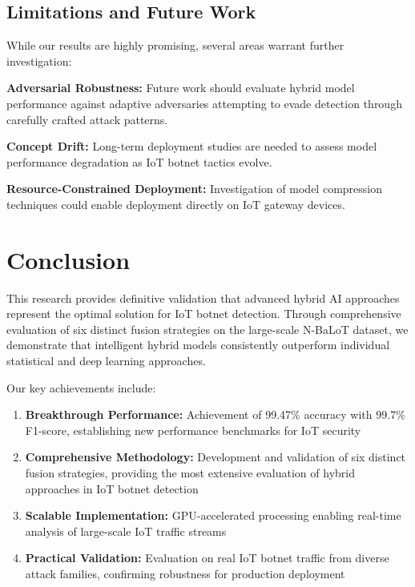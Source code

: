 \documentclass[conference]{IEEEtran}
\begin{document}
\subsection{Limitations and Future Work}
While our results are highly promising, several areas warrant further investigation:

\textbf{Adversarial Robustness:} Future work should evaluate hybrid model performance against adaptive adversaries attempting to evade detection through carefully crafted attack patterns.

\textbf{Concept Drift:} Long-term deployment studies are needed to assess model performance degradation as IoT botnet tactics evolve.

\textbf{Resource-Constrained Deployment:} Investigation of model compression techniques could enable deployment directly on IoT gateway devices.

\section{Conclusion}
This research provides definitive validation that advanced hybrid AI approaches represent the optimal solution for IoT botnet detection. Through comprehensive evaluation of six distinct fusion strategies on the large-scale N-BaLoT dataset, we demonstrate that intelligent hybrid models consistently outperform individual statistical and deep learning approaches.

Our key achievements include:
\begin{enumerate}
    \item \textbf{Breakthrough Performance:} Achievement of 99.47\% accuracy with 99.7\% F1-score, establishing new performance benchmarks for IoT security
    \item \textbf{Comprehensive Methodology:} Development and validation of six distinct fusion strategies, providing the most extensive evaluation of hybrid approaches in IoT botnet detection
    \item \textbf{Scalable Implementation:} GPU-accelerated processing enabling real-time analysis of large-scale IoT traffic streams
    \item \textbf{Practical Validation:} Evaluation on real IoT botnet traffic from diverse attack families, confirming robustness for production deployment
\end{enumerate}
\end{document}
